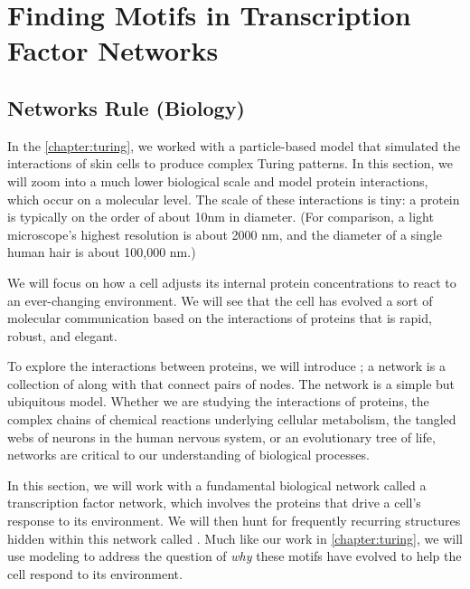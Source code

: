 \chapter[Finding Motifs in Transcription Factor Networks]{Finding Motifs in Transcription Factor Networks}
\label{chapter:motifs}
\renewcommand{\chaptertitle}{Finding Motifs in Transcription Factor Networks}


\FloatBarrier

\section{Networks Rule (Biology)}
\label{sec:introduction}

In the \autoref{chapter:turing}, we worked with a particle-based model that simulated the interactions of skin cells to produce complex Turing patterns. In this section, we will zoom into a much lower biological scale and model protein interactions, which occur on a molecular level. The scale of these interactions is tiny: a protein is typically on the order of about 10nm in diameter. (For comparison, a light microscope's highest resolution is about 2000 nm, and the diameter of a single human hair is about 100,000 nm.)

We will focus on how a cell adjusts its internal protein concentrations to react to an ever-changing environment.  We will see that the cell has evolved a sort of molecular communication based on the interactions of proteins that is rapid, robust, and elegant.

To explore the interactions between proteins, we will introduce ; a network is a collection of  along with  that connect pairs of nodes. The network is a simple but ubiquitous model. Whether we are studying the interactions of proteins, the complex chains of chemical reactions underlying cellular metabolism, the tangled webs of neurons in the human nervous system, or an evolutionary tree of life, networks are critical to our understanding of biological processes.

In this section, we will work with a fundamental biological network called a transcription factor network, which involves the proteins that drive a cell's response to its environment. We will then hunt for frequently recurring structures hidden within this network called . Much like our work in \autoref{chapter:turing}, we will use modeling to address the question of \textit{why} these motifs have evolved to help the cell respond to its environment.

